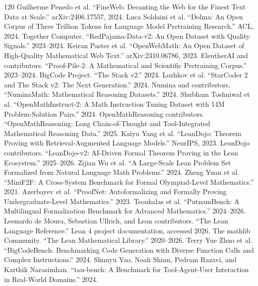 \documentclass[11pt]{article}
\newcommand{\1}{\mathbf{1}}
\begin{document}
\begin{thebibliography}{120}
 Guilherme Penedo et al. ``FineWeb: Decanting the Web for the Finest Text Data at Scale.'' arXiv:2406.17557, 2024.
 Luca Soldaini et al. ``Dolma: An Open Corpus of Three Trillion Tokens for Language Model Pretraining Research.'' ACL, 2024.
 Together Computer. ``RedPajama-Data-v2: An Open Dataset with Quality Signals.'' 2023--2024.
 Keiran Paster et al. ``OpenWebMath: An Open Dataset of High-Quality Mathematical Web Text.'' arXiv:2310.06786, 2023.
 EleutherAI and contributors. ``Proof-Pile-2: A Mathematical and Scientific Pretraining Corpus.'' 2023--2024.
 BigCode Project. ``The Stack v2.'' 2024.
 Lozhkov et al. ``StarCoder 2 and The Stack v2: The Next Generation.'' 2024.
 Numina and contributors. ``NuminaMath: Mathematical Reasoning Datasets.'' 2024.
 Shubham Toshniwal et al. ``OpenMathInstruct-2: A Math Instruction Tuning Dataset with 14M Problem-Solution Pairs.'' 2024.
 OpenMathReasoning contributors. ``OpenMathReasoning: Long Chain-of-Thought and Tool-Integrated Mathematical Reasoning Data.'' 2025.
 Kaiyu Yang et al. ``LeanDojo: Theorem Proving with Retrieval-Augmented Language Models.'' NeurIPS, 2023.
 LeanDojo contributors. ``LeanDojo-v2: AI-Driven Formal Theorem Proving in the Lean Ecosystem.'' 2025--2026.
 Zijian Wu et al. ``A Large-Scale Lean Problem Set Formalized from Natural Language Math Problems.'' 2024.
 Zheng Yuan et al. ``MiniF2F: A Cross-System Benchmark for Formal Olympiad-Level Mathematics.'' 2021.
 Azerbayev et al. ``ProofNet: Autoformalizing and Formally Proving Undergraduate-Level Mathematics.'' 2023.
 Tsoukalas et al. ``PutnamBench: A Multilingual Formalization Benchmark for Advanced Mathematics.'' 2024--2026.
 Leonardo de Moura, Sebastian Ullrich, and Lean contributors. ``The Lean Language Reference.'' Lean 4 project documentation, accessed 2026.
 The mathlib Community. ``The Lean Mathematical Library.'' 2020--2026.
 Terry Yue Zhuo et al. ``BigCodeBench: Benchmarking Code Generation with Diverse Function Calls and Complex Instructions.'' 2024.
 Shunyu Yao, Noah Shinn, Pedram Razavi, and Karthik Narasimhan. ``tau-bench: A Benchmark for Tool-Agent-User Interaction in Real-World Domains.'' 2024.

\end{thebibliography}
\end{document}
